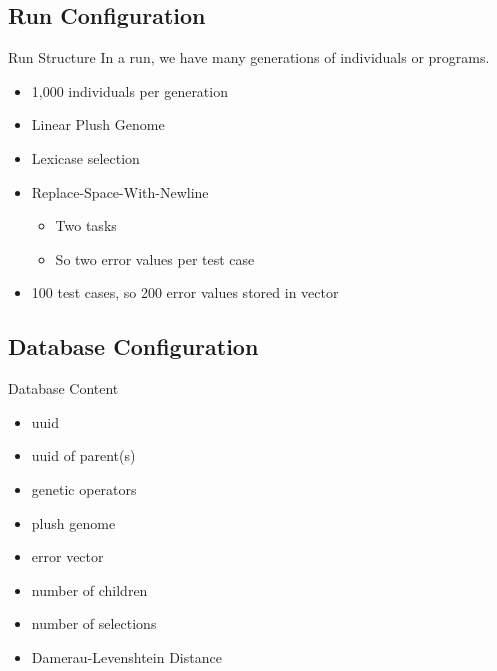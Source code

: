 \documentclass{beamer}
\begin{document}
\subsection{Run Configuration}
\begin{frame}{Run Structure}
In a run, we have many generations of individuals or programs.
\begin{itemize}
	\item 1,000 individuals per generation
	\item Linear Plush Genome~\cite{plush}
	\item Lexicase selection~\cite{Lexicase}
	\item Replace-Space-With-Newline
	\begin{itemize}
		\item Two tasks
		\item So two error values per test case
	\end{itemize}
	\item 100 test cases, so 200 error values stored in vector
\end{itemize}
\end{frame}

\subsection{Database Configuration}
\begin{frame}{Database Content}
	\begin{itemize}
		\item uuid
		\item uuid of parent(s)
		\item genetic operators
		\item plush genome
		\item error vector
		\item number of children
		\item number of selections
		\item Damerau-Levenshtein Distance
	\end{itemize}
\end{frame}

\end{document}

